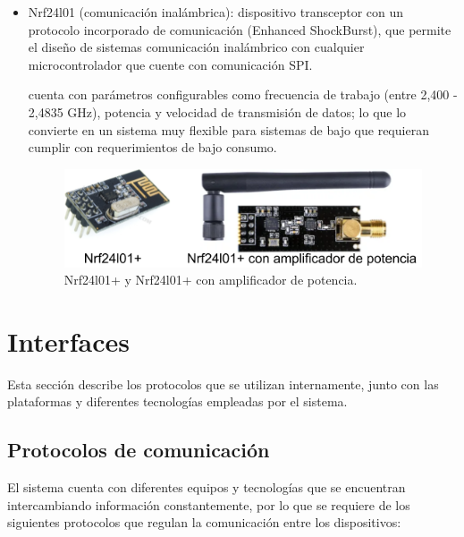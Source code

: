 \begin{itemize}
\item Nrf24l01 (comunicación inalámbrica): dispositivo transceptor con un protocolo incorporado de comunicación (Enhanced ShockBurst), que permite el diseño de sistemas comunicación inalámbrico con cualquier microcontrolador que cuente con comunicación SPI.

cuenta con parámetros configurables como frecuencia de trabajo (entre 2,400 - 2,4835 GHz), potencia y velocidad de transmisión de datos; lo que lo convierte en un sistema muy flexible para sistemas de bajo que requieran cumplir con requerimientos de bajo consumo.

\begin{figure}[h]
	\centering
	\includegraphics[scale=.65]{./Figures/Capitulo2/Figura_D.png}
	\caption{Nrf24l01+ y Nrf24l01+ con amplificador de potencia.}
	\label{fig:figura_d1}
\end{figure}
\end{itemize}

\section{Interfaces}

Esta sección describe los protocolos que se utilizan internamente, junto con las plataformas y diferentes tecnologías empleadas por el sistema.      


\subsection{Protocolos de comunicación }
El sistema cuenta con diferentes equipos y tecnologías que se encuentran intercambiando información constantemente, por lo que se requiere de los siguientes protocolos que regulan la comunicación entre los dispositivos:

